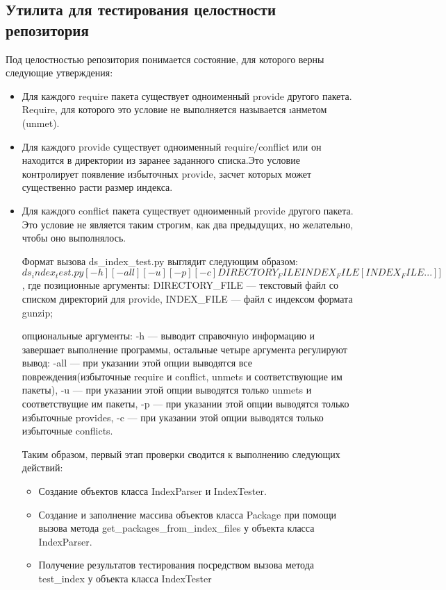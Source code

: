 \begin{enumerate}
{\subsection{Утилита для тестирования целостности репозитория}
Под целостностью репозитория понимается состояние, для которого
верны следующие утверждения:
\begin{itemize}
\item{Для каждого require пакета существует одноименный provide 
другого пакета. Require, для которого это условие не выполняется
называется \i анметом (unmet). }
\item{Для каждого provide существует одноименный require/conflict или
он находится в директории из заранее заданного списка.Это условие 
контролирует появление избыточных provide, засчет которых %
может существенно расти размер индекса.}
\item{Для каждого conflict пакета существует одноименный provide 
другого пакета. Это условие не является таким строгим, как два предыдущих,
но желательно, чтобы оно выполнялось. }

Формат вызова ds_index_test.py выглядит следующим образом:
$ds_index_test.py [-h] [-all] [-u] [-p] [-c] DIRECTORY_FILE INDEX_FILE [INDEX_FILE ...]]$, где
позиционные аргументы:
DIRECTORY_FILE --- текстовый файл со списком директорий для provide,
INDEX_FILE --- файл с индексом формата gunzip;

опциональные аргументы:
-h --- выводит справочную информацию и завершает выполнение программы,
остальные четыре аргумента регулируют вывод:
-all --- при указании этой опции выводятся все повреждения(избыточные require и conflict, unmets и
соответствующие им пакеты),
-u --- при указании этой опции выводятся только unmets и соответствущие им пакеты,
-p --- при указании этой опции выводятся только  избыточные provides,
-c --- при указании этой опции выводятся только избыточные conflicts.


Таким образом, первый этап проверки сводится к выполнению следующих действий:
\begin{itemize}
\item{Создание объектов класса IndexParser и IndexTester.}
\item{Создание и заполнение массива объектов класса Package при помощи
вызова метода get_packages_from_index_files у объекта класса IndexParser.}
\item{Получение результатов тестирования посредством вызова метода test_index
у объекта класса IndexTester}




\end{itemize}
\end{itemize}}
\end{enumerate}
